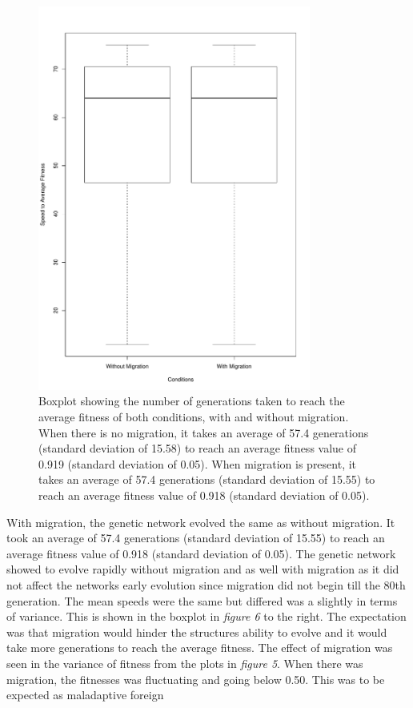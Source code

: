 \\
\begin{figure}[h]
    \centering
        \includegraphics[width=0.8\textwidth]{../Results/boxplot_migration.pdf}
    \caption{Boxplot showing the number of generations taken to reach the average fitness of both conditions, with and without migration. When there is no migration, it takes an average of 57.4 generations (standard deviation of 15.58) to reach an average fitness value of 0.919 (standard deviation of 0.05). When migration is present, it takes an average of 57.4 generations (standard deviation of 15.55) to reach an average fitness value of 0.918 (standard deviation of 0.05).}
    \label{fig:Speed to average fit}
\end{figure}
With migration, the genetic network evolved the same as without migration. It took an average of 57.4 generations (standard deviation of 15.55) to reach an average fitness value of 0.918 (standard deviation of 0.05). The genetic network showed to evolve rapidly without migration and as well with migration as it did not affect the networks early evolution since migration did not begin till the 80th generation. The mean speeds were the same but differed was a slightly in terms of variance. This is shown in the boxplot in \textit{figure 6} to the right. The expectation was that migration would hinder the structures ability to evolve and it would take more generations to reach the average fitness. The effect of migration was seen in the variance of fitness from the plots in \textit{figure 5}. When there was migration, the fitnesses was fluctuating and going below 0.50. This was to be expected as maladaptive foreign


